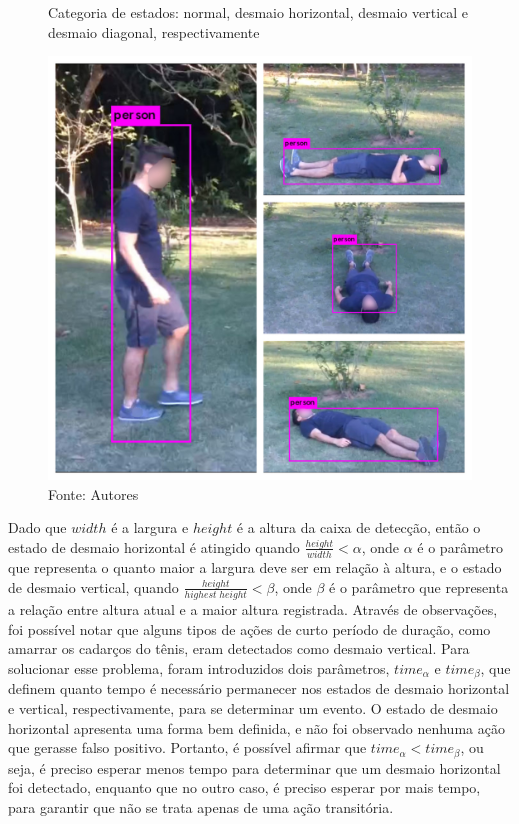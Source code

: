 \documentclass[]{politex}
\begin{document}
\begin{figure}[H]
    \centering
    \caption{Categoria de estados: normal, desmaio horizontal, desmaio vertical e desmaio diagonal, respectivamente}
    \includegraphics[width=\textwidth]{ClassesDesmaio.jpg}
    \caption*{Fonte: Autores}
    \label{fig:classes_desmaio}
\end{figure}

Dado que \(width\) é a largura e \(height\) é a altura da caixa de detecção, então o estado de desmaio horizontal é atingido quando \(\frac{height}{width}<\alpha\), onde \(\alpha\) é o parâmetro que representa o quanto maior a largura deve ser em relação à altura, e o estado de desmaio vertical, quando \(\frac{height}{highest\;height} < \beta\), onde \(\beta\) é o parâmetro que representa a relação entre altura atual e a maior altura registrada. Através de observações, foi possível notar que alguns tipos de ações de curto período de duração, como amarrar os cadarços do tênis, eram detectados como desmaio vertical. Para solucionar esse problema, foram introduzidos dois parâmetros, \(time_\alpha\) e \(time_\beta\), que definem quanto tempo é necessário permanecer nos estados de desmaio horizontal e vertical, respectivamente, para se determinar um evento. O estado de desmaio horizontal apresenta uma forma bem definida, e não foi observado nenhuma ação que gerasse falso positivo. Portanto, é possível afirmar que \(time_\alpha < time_\beta\), ou seja, é preciso esperar menos tempo para determinar que um desmaio horizontal foi detectado, enquanto que no outro caso, é preciso esperar por mais tempo, para garantir que não se trata apenas de uma ação transitória.
\end{document}
